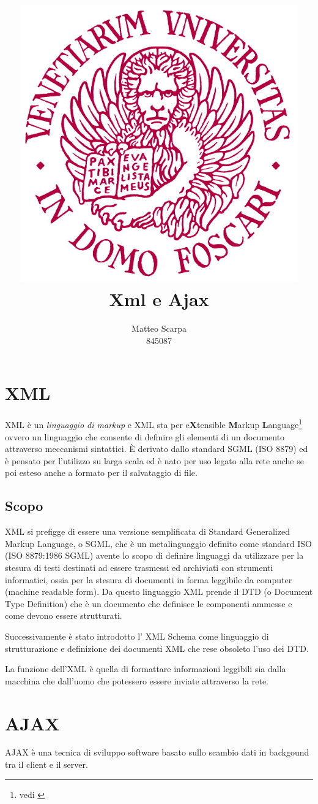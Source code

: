 \documentclass{report}
\title{\includegraphics[width=120mm]{logo-unive.png} \\ Xml e Ajax}
\author{Matteo Scarpa\\ 845087}
\date{}
\begin{document}
\maketitle

\chapter{XML}
XML è un \textit{linguaggio di markup} e XML sta per e\textbf{X}tensible \textbf{M}arkup \textbf{L}anguage\footnote{vedi \cite{site:w3c}} ovvero un linguaggio che consente di definire gli elementi di un documento attraverso meccanismi sintattici.
È derivato dallo standard SGML (ISO 8879) ed è pensato per l'utilizzo su larga scala ed è nato per uso legato alla rete anche se poi esteso anche a formato per il salvataggio di file.

\section{Scopo}
XML si prefigge di essere una versione semplificata di Standard Generalized Markup Language, o SGML, che è un metalinguaggio definito come standard ISO (ISO 8879:1986 SGML) avente lo scopo di definire linguaggi da utilizzare per la stesura di testi destinati ad essere trasmessi ed archiviati con strumenti informatici, ossia per la stesura di documenti in forma leggibile da computer (machine readable form). Da questo linguaggio XML prende il DTD (o Document Type Definition) che è un documento che definisce le componenti ammesse e come devono essere strutturati.

Successivamente è stato introdotto l' XML Schema come linguaggio di strutturazione e definizione dei documenti XML che rese obsoleto l'uso dei DTD.


La funzione dell'XML è quella di formattare informazioni leggibili sia dalla macchina che dall'uomo che potessero essere inviate attraverso la rete.

\chapter{AJAX}
AJAX è una tecnica di sviluppo software basato sullo scambio dati in backgound tra il client e il server. 

\nocite{w3c}
\printbibliography
\end{document}
